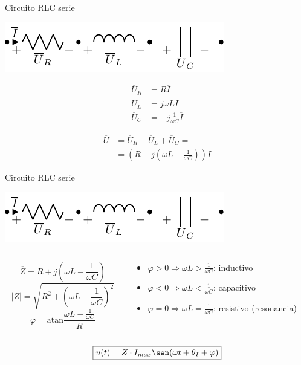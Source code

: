 \documentclass[aspectratio=169, usenames,svgnames,dvipsnames]{beamer}
\newcommand{\atan}{\mathrm{atan}}
\begin{document}
\begin{frame}[label={sec:org929b259}]{Circuito RLC serie}
\begin{center}
\includegraphics[height=0.2\textheight]{../figs/RLC.pdf}
\end{center}

\begin{align*}
  \overline{U}_R &= R \overline{I}\\
  \overline{U}_L &= j\omega L \overline{I}\\
  \overline{U}_C &= -j \frac{1}{\omega C} \overline{I}
\end{align*}

\begin{align*}
  \overline{U} &= \overline{U}_R + \overline{U}_L + \overline{U}_C =\\
               &= \left(R + j(\omega L - \frac{1}{\omega C})\right) \overline{I} 
\end{align*}
\end{frame}

\begin{frame}[label={sec:org296b833}]{Circuito RLC serie}
\begin{center}
\includegraphics[height=0.2\textheight]{../figs/RLC.pdf}
\end{center}

\begin{columns}
\begin{column}{0.4\columnwidth}
\[
\overline{Z} = R + j(\omega L - \frac{1}{\omega C})
\]
\[
  |Z| = \sqrt{R^2 + (\omega L - \frac{1}{\omega C})^2}
\]
\[
  \varphi = \atan{\frac{\omega L - \frac{1}{\omega C}}{R}}
\]
\end{column}

\begin{column}{0.6\columnwidth}
\begin{itemize}
\item \(\varphi > 0 \Rightarrow \omega L > \frac{1}{\omega C}\): inductivo
\item \(\varphi < 0 \Rightarrow \omega L < \frac{1}{\omega C}\): capacitivo
\item \(\varphi = 0 \Rightarrow \omega L = \frac{1}{\omega C}\): resistivo (resonancia)
\end{itemize}
\end{column}
\end{columns}

\[
\boxed{u(t) = Z \cdot I_{max} \sen(\omega t + \theta_I + \varphi)}
\]
\end{frame}
\end{document}
